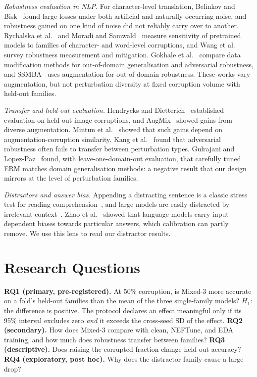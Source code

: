 \documentclass[conference]{IEEEtran}
\begin{document}
\textit{Robustness evaluation in NLP.} For character-level translation, Belinkov and Bisk~\cite{belinkov2018synthetic} found large losses under both artificial and naturally occurring noise, and robustness gained on one kind of noise did not reliably carry over to another. Rychalska et al.~\cite{rychalska2019wild} and Moradi and Samwald~\cite{moradi2021evaluating} measure sensitivity of pretrained models to families of character- and word-level corruptions, and Wang et al.~\cite{wang2022measure} survey robustness measurement and mitigation. Gokhale et al.~\cite{gokhale2022generalized} compare data modification methods for out-of-domain generalisation and adversarial robustness, and SSMBA~\cite{ng2020ssmba} uses augmentation for out-of-domain robustness. These works vary augmentation, but not perturbation diversity at fixed corruption volume with held-out families.

\textit{Transfer and held-out evaluation.} Hendrycks and Dietterich~\cite{hendrycks2019benchmarking} established evaluation on held-out image corruptions, and AugMix~\cite{hendrycks2020augmix} showed gains from diverse augmentation. Mintun et al.~\cite{mintun2021interaction} showed that such gains depend on augmentation-corruption similarity. Kang et al.~\cite{kang2019transfer} found that adversarial robustness often fails to transfer between perturbation types. Gulrajani and Lopez-Paz~\cite{gulrajani2021search} found, with leave-one-domain-out evaluation, that carefully tuned ERM matches domain generalisation methods: a negative result that our design mirrors at the level of perturbation families.

\textit{Distractors and answer bias.} Appending a distracting sentence is a classic stress test for reading comprehension~\cite{jia2017adversarial}, and large models are easily distracted by irrelevant context~\cite{shi2023distracted}. Zhao et al.~\cite{zhao2021calibrate} showed that language models carry input-dependent biases towards particular answers, which calibration can partly remove. We use this lens to read our distractor results.

\section{Research Questions}
\label{sec:rq}

\textbf{RQ1 (primary, pre-registered).} At 50\% corruption, is Mixed-3 more accurate on a fold's held-out families than the mean of the three single-family models? $H_1$: the difference is positive. The protocol declares an effect meaningful only if its 95\% interval excludes zero \emph{and} it exceeds the cross-seed SD of the effect. \textbf{RQ2 (secondary).} How does Mixed-3 compare with clean, NEFTune, and EDA training, and how much does robustness transfer between families? \textbf{RQ3 (descriptive).} Does raising the corrupted fraction change held-out accuracy? \textbf{RQ4 (exploratory, post hoc).} Why does the distractor family cause a large drop?
\end{document}
